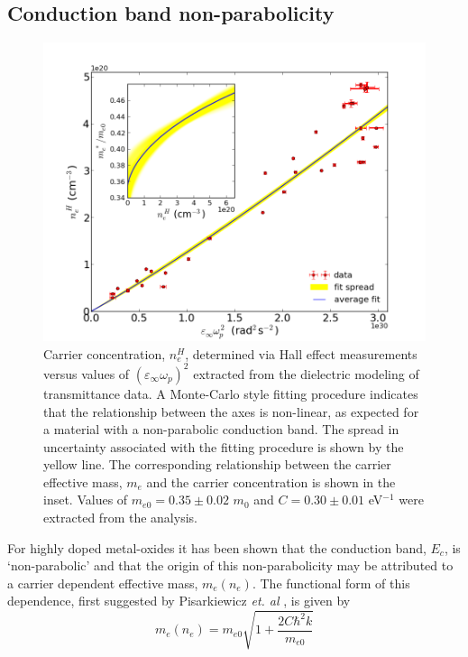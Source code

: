 \documentclass[final,5p,times]{elsarticle}
\begin{document}
\subsection{ Conduction band non-parabolicity}
\label{sec:2.2}
\begin{figure}[ht]
\centering
\includegraphics[width = 1\columnwidth]{figure3b.png}
\caption{\label{fig:3} Carrier concentration, $n_e^H$, determined via Hall effect measurements versus values of $(\varepsilon_{\infty}\omega_p)^2$ extracted from the dielectric modeling of transmittance data. A Monte-Carlo style fitting procedure \cite{Mendelsberg2009, Anders2012} indicates that the relationship between the axes is non-linear, as expected for a material with a non-parabolic conduction band. The spread in uncertainty associated with the fitting procedure is shown by the yellow line. The corresponding relationship between the carrier effective mass, $m_e$ and the carrier concentration is shown in the inset. Values of $m_{e0}=0.35 \pm 0.02$ $m_{0}$ and $C = 0.30 \pm 0.01$ eV$^{-1}$ were extracted from the analysis.}
\end{figure}
For highly doped metal-oxides it has been shown that the conduction band, $E_c$, is `non-parabolic' and that the origin of this non-parabolicity may be attributed to a carrier dependent effective mass, $m_e(n_e)$. The functional form of this dependence, first suggested by Pisarkiewicz \textit{et. al} \cite{Pisarkiewicz1990}, is given by
\begin{equation}
\label{eqn:3}
m_e(n_e) = m_{e0}\sqrt{1+\frac{2C\hbar^2k}{m_{e0}}}
\end{equation}
\end{document}
